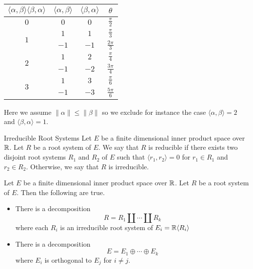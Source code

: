 \documentclass[a4paper]{article}
\begin{document}
\begin{table}[!h]
\centering
\begin{tabular}{|c|c|c|c|}
\hline
$\langle\alpha,\beta\rangle\langle\beta,\alpha\rangle$ & $\langle\alpha,\beta\rangle$ & $\langle\beta,\alpha\rangle$ & $\theta$         \\ \hline
$0$                                                    & $0$                          & $0$                          & $\frac{\pi}{2}$  \\[1.5ex] \hline
\multirow{2}{*}{$1$}                                   & $1$                          & $1$                          & $\frac{\pi}{3}$  \\[1.5ex] \cline{2-4} 
                                                       & $-1$                         & $-1$                         & $\frac{2\pi}{3}$ \\[1.5ex] \hline
\multirow{2}{*}{$2$}                                   & $1$                          & $2$                          & $\frac{\pi}{4}$  \\[1.5ex] \cline{2-4} 
                                                       & $-1$                         & $-2$                         & $\frac{3\pi}{4}$ \\[1.5ex] \hline
\multirow{2}{*}{$3$}                                   & $1$                          & $3$                          & $\frac{\pi}{6}$  \\[1.5ex] \cline{2-4} 
                                                       & $-1$                         & $-3$                         & $\frac{5\pi}{6}$ \\[1.5ex] \hline
\end{tabular}
\end{table}

Here we assume $\|\alpha\|\leq\|\beta\|$ so we exclude for instance the case $\langle\alpha,\beta\rangle=2$ and $\langle\beta,\alpha\rangle=1$. 

\begin{defn}{Irreducible Root Systems}{} Let $E$ be a finite dimensional inner product space over $\mathbb{R}$. Let $R$ be a root system of $E$. We say that $R$ is reducible if there exists two disjoint root systems $R_1$ and $R_2$ of $E$ such that $\langle r_1,r_2\rangle=0$ for $r_1\in R_1$ and $r_2\in R_2$. Otherwise, we say that $R$ is irreducible. 
\end{defn}

\begin{prp}{}{} Let $E$ be a finite dimensional inner product space over $\mathbb{R}$. Let $R$ be a root system of $E$. Then the following are true. 
\begin{itemize}
\item There is a decomposition $$R=R_1\amalg\cdots\amalg R_k$$ where each $R_i$ is an irreducible root system of $E_i=\mathbb{R}\langle R_i\rangle$
\item There is a decomposition $$E=E_1\oplus\cdots\oplus E_k$$ where $E_i$ is orthogonal to $E_j$ for $i\neq j$. 
\end{itemize}
\end{prp}
\end{document}
